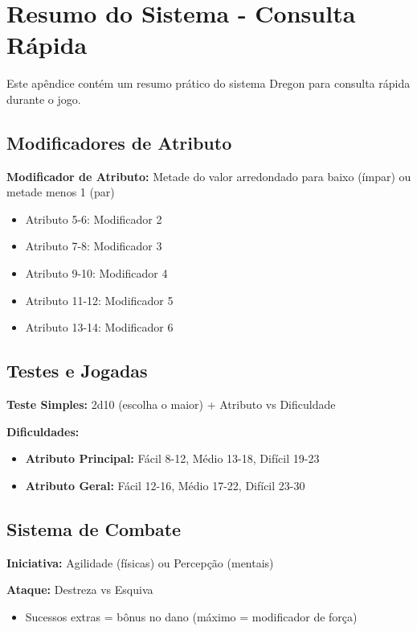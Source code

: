 
\appendix
\chapter{Resumo do Sistema - Consulta Rápida}
\label{Ap:resumo}

Este apêndice contém um resumo prático do sistema Dregon para consulta rápida durante o jogo.

\section{Modificadores de Atributo}

\textbf{Modificador de Atributo:} Metade do valor arredondado para baixo (ímpar) ou metade menos 1 (par)
\begin{itemize}
    \item Atributo 5-6: Modificador 2
    \item Atributo 7-8: Modificador 3
    \item Atributo 9-10: Modificador 4
    \item Atributo 11-12: Modificador 5
    \item Atributo 13-14: Modificador 6
\end{itemize}

\section{Testes e Jogadas}

\textbf{Teste Simples:} 2d10 (escolha o maior) + Atributo vs Dificuldade

\textbf{Dificuldades:}
\begin{itemize}
    \item \textbf{Atributo Principal:} Fácil 8-12, Médio 13-18, Difícil 19-23
    \item \textbf{Atributo Geral:} Fácil 12-16, Médio 17-22, Difícil 23-30
\end{itemize}


\section{Sistema de Combate}

\textbf{Iniciativa:} Agilidade (físicas) ou Percepção (mentais)

\textbf{Ataque:} Destreza vs Esquiva
\begin{itemize}
    \item Sucessos extras = bônus no dano (máximo = modificador de força)
\end{itemize}

